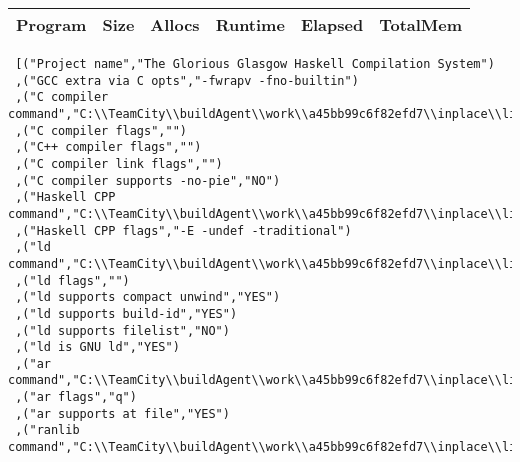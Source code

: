 \begin{tabular}{ c c c c c c }
Program & Size & Allocs & Runtime & Elapsed & TotalMem\\
\hline
\end{tabular}
\begin{verbatim}
 [("Project name","The Glorious Glasgow Haskell Compilation System")
 ,("GCC extra via C opts","-fwrapv -fno-builtin")
 ,("C compiler command","C:\\TeamCity\\buildAgent\\work\\a45bb99c6f82efd7\\inplace\\lib\\../mingw/bin/gcc.exe")
 ,("C compiler flags","")
 ,("C++ compiler flags","")
 ,("C compiler link flags","")
 ,("C compiler supports -no-pie","NO")
 ,("Haskell CPP command","C:\\TeamCity\\buildAgent\\work\\a45bb99c6f82efd7\\inplace\\lib\\../mingw/bin/gcc.exe")
 ,("Haskell CPP flags","-E -undef -traditional")
 ,("ld command","C:\\TeamCity\\buildAgent\\work\\a45bb99c6f82efd7\\inplace\\lib\\../mingw/bin/ld.exe")
 ,("ld flags","")
 ,("ld supports compact unwind","YES")
 ,("ld supports build-id","YES")
 ,("ld supports filelist","NO")
 ,("ld is GNU ld","YES")
 ,("ar command","C:\\TeamCity\\buildAgent\\work\\a45bb99c6f82efd7\\inplace\\lib\\../mingw/bin/ar.exe")
 ,("ar flags","q")
 ,("ar supports at file","YES")
 ,("ranlib command","C:\\TeamCity\\buildAgent\\work\\a45bb99c6f82efd7\\inplace\\lib\\../mingw/bin/ranlib.exe")

\end{verbatim}
